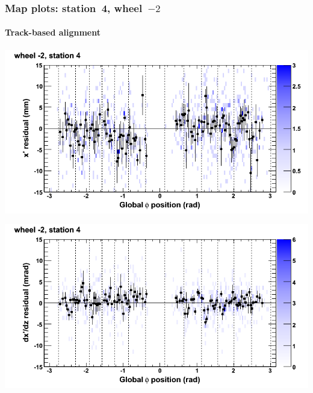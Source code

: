 \documentclass[compress]{beamer}
\begin{document}
\begin{frame}
\frametitle{Map plots: station~4, wheel~$-2$}
\framesubtitle{Track-based alignment}
\includegraphics[width=0.5\linewidth]{mapplots_re05/DTvsphi_st4whA_x.png}

\includegraphics[width=0.5\linewidth]{mapplots_re05/DTvsphi_st4whA_dxdz.png}
\end{frame}
\end{document}
